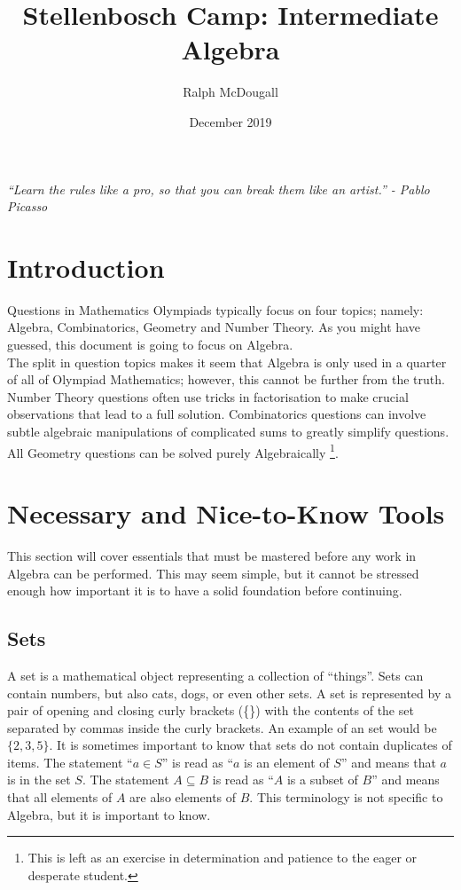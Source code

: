 \documentclass[a4paper,12pt]{article}
\begin{document}
\title{Stellenbosch Camp: Intermediate Algebra}
\author{Ralph McDougall}
\date{December 2019}
\maketitle

\centerline{ \textit{``Learn the rules like a pro, so that you can break them like an artist.'' - Pablo Picasso} }

\section{Introduction}

Questions in Mathematics Olympiads typically focus on four topics; namely: Algebra, Combinatorics, Geometry and Number Theory. As you might have guessed, this document is going to focus on Algebra. \\

The split in question topics makes it seem that Algebra is only used in a quarter of all of Olympiad Mathematics; however, this cannot be further from the truth. Number Theory questions often use tricks in factorisation to make crucial observations that lead to a full solution. Combinatorics questions can involve subtle algebraic manipulations of complicated sums to greatly simplify questions. All Geometry questions can be solved purely Algebraically \footnote{This is left as an exercise in determination and patience to the eager or desperate student.}. \\

\clearpage

\section{Necessary and Nice-to-Know Tools}
This section will cover essentials that must be mastered before any work in Algebra can be performed. This may seem simple, but it cannot be stressed enough how important it is to have a solid foundation before continuing.

\subsection{Sets}
A set is a mathematical object representing a collection of ``things''. Sets can contain numbers, but also cats, dogs, or even other sets. A set is represented by a pair of opening and closing curly brackets (\{\}) with the contents of the set separated by commas inside the curly brackets. An example of an set would be $\{2, 3, 5\}$. It is sometimes important to know that sets do not contain duplicates of items. The statement ``$a \in S$'' is read as ``$a$ is an element of $S$'' and means that $a$ is in the set $S$. The statement $A \subseteq B$ is read as ``$A$ is a subset of $B$'' and means that all elements of $A$ are also elements of $B$. This terminology is not specific to Algebra, but it is important to know.\\
\end{document}
